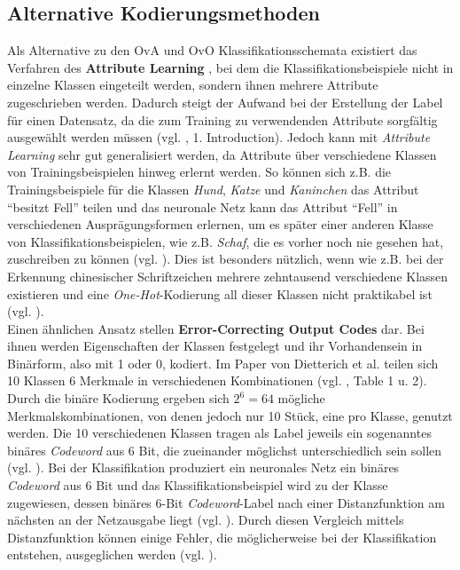 \subsection{Alternative Kodierungsmethoden}
Als Alternative zu den OvA und OvO Klassifikationsschemata existiert das Verfahren des \textbf{Attribute Learning} \cite{attributeLearning, attributeLearningChinese}, bei dem die Klassifikationsbeispiele nicht in einzelne Klassen eingeteilt werden, sondern ihnen mehrere Attribute zugeschrieben werden. Dadurch steigt der Aufwand bei der Erstellung der Label für einen Datensatz, da die zum Training zu verwendenden Attribute sorgfältig ausgewählt werden müssen (vgl. \cite{pawaraPaper}, 1. Introduction). Jedoch kann mit \textit{Attribute Learning} sehr gut generalisiert werden, da Attribute über verschiedene Klassen von Trainingsbeispielen hinweg erlernt werden. So können sich z.B. die Trainingsbeispiele für die Klassen \textit{Hund}, \textit{Katze} und \textit{Kaninchen} das Attribut \enquote{besitzt Fell} teilen und das neuronale Netz kann das Attribut \enquote{Fell} in verschiedenen Ausprägungsformen erlernen, um es später einer anderen Klasse von Klassifikationsbeispielen, wie z.B. \textit{Schaf}, die es vorher noch nie gesehen hat, zuschreiben zu können (vgl. \cite{attributeLearning}). Dies ist besonders nützlich, wenn wie z.B. bei der Erkennung chinesischer Schriftzeichen mehrere zehntausend verschiedene Klassen existieren und eine \textit{One-Hot}-Kodierung all dieser Klassen nicht praktikabel ist (vgl. \cite{attributeLearningChinese}).\\

Einen ähnlichen Ansatz stellen \textbf{Error-Correcting Output Codes} \cite{errorCorrectingCodes} dar. Bei ihnen werden Eigenschaften der Klassen festgelegt und ihr Vorhandensein in Binärform, also mit 1 oder 0, kodiert. Im Paper von Dietterich et al. \cite{errorCorrectingCodes} teilen sich 10 Klassen 6 Merkmale in verschiedenen Kombinationen (vgl. \cite{errorCorrectingCodes}, Table 1 u. 2). Durch die binäre Kodierung ergeben sich $2^6 = 64$ mögliche Merkmalskombinationen, von denen jedoch nur 10 Stück, eine pro Klasse, genutzt werden. Die 10 verschiedenen Klassen tragen als Label jeweils ein sogenanntes binäres \textit{Codeword} aus 6 Bit, die zueinander möglichst unterschiedlich sein sollen (vgl. \cite{errorCorrectingCodes}). Bei der Klassifikation produziert ein neuronales Netz ein binäres \textit{Codeword} aus 6 Bit und das Klassifikationsbeispiel wird zu der Klasse zugewiesen, dessen binäres 6-Bit \textit{Codeword}-Label nach einer Distanzfunktion am nächsten an der Netzausgabe liegt (vgl. \cite{errorCorrectingCodes}). Durch diesen Vergleich mittels Distanzfunktion können einige Fehler, die möglicherweise bei der Klassifikation entstehen, ausgeglichen werden (vgl. \cite{errorCorrectingCodes}).\\


